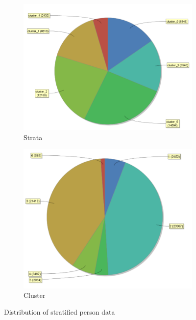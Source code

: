 \begin{figure}[H]
	\vspace{-3em}
	\centering
	\begin{subfigure}{.43\textwidth}
		\centering
		\includegraphics[width=.9\linewidth]{vectorclusteringcluster.PNG}
		\caption{Strata}
		\label{fig:VecSt}
	\end{subfigure}%
	\begin{subfigure}{.4\textwidth}
		\centering
		\includegraphics[width=.9\linewidth]{vectorclusteringstrata.PNG}
		\caption{Cluster}
		\label{fig:VecCl}
	\end{subfigure}
	\caption{Distribution of stratified person data}
	\label{fig:VecDist}
\end{figure}
\vspace*{-3em}

